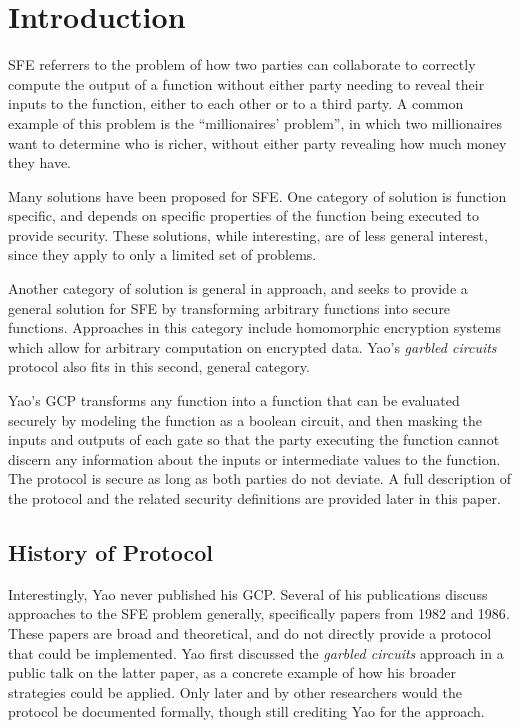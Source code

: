 \section{Introduction}
\label{sec:intro}

\ac{SFE} referrers to the problem of how two parties can collaborate to correctly compute the output of a function without either party needing to reveal their inputs to the function, either to each other or to a third party.  A common example of this problem is the ``millionaires' problem'', in which two millionaires want to determine who is richer, without either party revealing how much money they have\cite{yao1982protocols}.

Many solutions have been proposed for \ac{SFE}. One category of solution is function specific, and depends on specific properties of the function being executed to provide security\cite{huang2011faster}.  These solutions, while interesting, are of less general interest, since they apply to only a limited set of problems.

Another category of solution is general in approach, and seeks to provide a general solution for \ac{SFE} by transforming arbitrary functions into secure functions. Approaches in this category include homomorphic encryption systems\cite{gentry2009fully} which allow for arbitrary computation on encrypted data.  Yao's \emph{garbled circuits} protocol also fits in this second, general category.

Yao's \ac{GCP} transforms any function into a function that can be evaluated securely by modeling the function as a boolean circuit, and then masking the inputs and outputs of each gate so that the party executing the function cannot discern any information about the inputs or intermediate values to the function. The protocol is secure as long as both parties do not deviate. A full description of the protocol and the related security definitions are provided later in this paper.

\subsection{History of Protocol}

Interestingly, Yao never published his \ac{GCP}. Several of his publications discuss approaches to the \ac{SFE} problem generally, specifically papers from 1982\cite{yao1982protocols} and 1986\cite{yao1986generate}. These papers are broad and theoretical, and do not directly provide a protocol that could be implemented. Yao first discussed the \emph{garbled circuits} approach in a public talk on the latter paper, as a concrete example of how his broader strategies could be applied\cite{bellare2012foundations}. Only later and by other researchers would the protocol be documented formally\cite{goldreich1987play}, though still crediting Yao for the approach.

